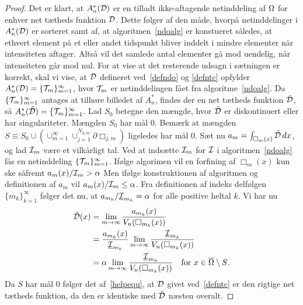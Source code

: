 \begin{proof}
Det er klart, at $A_n^{\ast}({\mathcal{D}})$ er en tilladt ikke-aftagende
netinddeling af $\Omega$ for enhver net tætheds funktion ${\mathcal{D}}$. Dette
følger af den måde, hvorpå netinddelinger i $A_n^{\ast}({\mathcal{D}})$ er 
sorteret samt af, at algoritmen~\ref{ndoalg} er konstueret således, at 
ethvert element på et eller andet tidspunkt bliver inddelt i mindre
elementer når intensiteten aftager. Altså vil det samlede antal 
elementer gå mod uendelig, når intensiteten går mod nul. For at vise 
at det resterende udsagn i sætningen er korrekt, skal vi vise, at 
${\mathcal{D}}$ defineret ved~\eqref{defndo} og \eqref{defntc} opfylder 
$A_n^{\ast}({\mathcal{D}}) = \{\mathcal T_m\}_{m=1}^\infty$, hvor $\mathcal T_m$ er netinddelingen
fået fra algoritme~\ref{ndoalg}. Da $\{\mathcal T_m\}_{m=1}^\infty$ antages at 
tilhøre billedet af $A_n^{\ast}$, findes der en net tætheds funktion
$\tilde{{\mathcal{D}}}$, så $A_n^{\ast}(\tilde{{\mathcal{D}}})=\{\mathcal T_m\}_{m=1}^\infty$. Lad
$S_0$ betegne den mængde, hvor $\tilde{{\mathcal{D}}}$ er diskontinuert eller 
har singulariteter. Mængden $S_0$ har mål $0$. Bemærk at mængden 
$S\equiv S_0 \cup ( \cup_{m=1}^\infty \cup_{j=1}^{N_{a,m}} \partial
\Box_{j,m})$ ligeledes har mål $0$. Sæt nu
$a_m=\int_{\Box_m(x)} \tilde{{\mathcal{D}}}\, dx$, og lad $\mathcal I_m$ være et 
vilkårligt tal. Ved at indsætte $\mathcal I_m$ for $\mathcal I$ i algoritmen~\ref{ndoalg}
fås en netinddeling $\{\mathcal T_m\}_{m=1}^\infty$. Ifølge algorimen vil en
forfining af $\Box_m(x)$ kun ske såfremt $a_m(x)/\mathcal I_m > \alpha$
Men ifølge konstruktionen af algoritmen og definitionen af $a_m$ vil 
$a_m(x)/\mathcal I_m \leq \alpha$. Fra definitionen af indeks delfølgen
$\{ m_k \}_{k=1}^\infty$ følger det nu, at $a_{m_k}/\underline{\mathcal I}_{m_k}
= \alpha$ for alle positive heltal $k$. Vi har nu
\begin{align} \label{helpequ}
  \tilde{{\mathcal{D}}}(x) & = \lim_{m\rightarrow\infty}
    \frac{a_{m_k}(x)}{V_n(\Box_{m_k}(x))} \\
  & = \frac{a_{m_k}(x)}{\underline{\mathcal I}_{m_k}} 
    \lim_{m\rightarrow\infty} 
    \frac{\underline{\mathcal I}_{m_k}}{V_n(\Box_{m_k}(x))} \notag \\
  & = \alpha \lim_{m\rightarrow\infty} \frac{\underline{\mathcal I}_{m_k}}{V_n(\Box_{m_k}(x))} 
    \quad \text{for $x\in\overline{\Omega}\setminus S$.}\notag
\end{align}
Da $S$ har mål $0$ følger det af~\eqref{helpequ}, at ${\mathcal{D}}$ givet ved~\eqref{defntc} 
er den rigtige net tætheds funktion, da den er identiske med $\tilde{{\mathcal{D}}}$
næsten overalt.
\end{proof}


